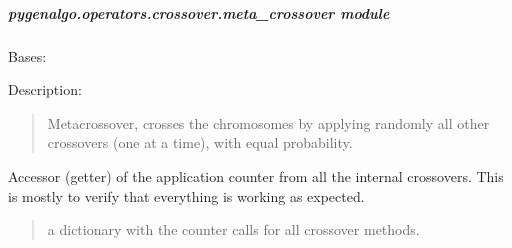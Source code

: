 \documentclass[letterpaper,10pt,english]{sphinxmanual}
\begin{document}
\subparagraph{pygenalgo.operators.crossover.meta\_crossover module}
\label{\detokenize{pygenalgo.operators.crossover:module-pygenalgo.operators.crossover.meta_crossover}}\label{\detokenize{pygenalgo.operators.crossover:pygenalgo-operators-crossover-meta-crossover-module}}

\begin{fulllineitems}
\label{\detokenize{pygenalgo.operators.crossover:pygenalgo.operators.crossover.meta_crossover.MetaCrossover}}
\pysigstartsignatures
\pysiglinewithargsret
{}
{}
{}
\pysigstopsignatures
\sphinxAtStartPar
Bases: {\hyperref[\detokenize{pygenalgo.operators.crossover:pygenalgo.operators.crossover.crossover_operator.CrossoverOperator}]{}}

\sphinxAtStartPar
Description:
\begin{quote}

\sphinxAtStartPar
Meta\sphinxhyphen{}crossover, crosses the chromosomes by applying randomly
all other crossovers (one at a time), with equal probability.
\end{quote}

\begin{fulllineitems}
\label{\detokenize{pygenalgo.operators.crossover:pygenalgo.operators.crossover.meta_crossover.MetaCrossover.all_counters}}
\pysigstartsignatures
\pysigline
{}
\pysigstopsignatures
\sphinxAtStartPar
Accessor (getter) of the application counter from all the internal crossovers.
This is mostly to verify that everything is working as expected.
\begin{quote}\begin{description}
\sphinxAtStartPar
a dictionary with the counter calls for all crossover methods.


\end{description}
\end{quote}
\end{fulllineitems}
\end{fulllineitems}
\end{document}

